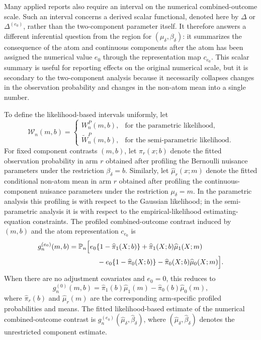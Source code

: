 \documentclass[11pt]{article}
\begin{document}
Many applied reports also require an interval on the numerical combined-outcome scale. Such an interval concerns a derived scalar functional, denoted here by $\Delta$ or $\Delta^{(e_0)}$, rather than the two-component parameter itself. It therefore answers a different inferential question from the region for $(\mu_\delta,\beta_\delta)$: it summarizes the consequence of the atom and continuous components after the atom has been assigned the numerical value $e_0$ through the representation map $c_{e_0}$. This scalar summary is useful for reporting effects on the original numerical scale, but it is secondary to the two-component analysis because it necessarily collapses changes in the observation probability and changes in the non-atom mean into a single number.

To define the likelihood-based intervals uniformly, let
\begin{equation}
  \mathcal{W}_n(m,b)
  =
  \begin{cases}
    W_n^P(m,b), & \text{for the parametric likelihood},\\[0.4em]
    \widetilde{W}_n^P(m,b), & \text{for the semi-parametric likelihood}.
  \end{cases}
  \label{eq:generic-lr-surface}
\end{equation}
For fixed component contrasts $(m,b)$, let $\widehat{\pi}_r(x;b)$ denote the fitted observation probability in arm $r$ obtained after profiling the Bernoulli nuisance parameters under the restriction $\beta_\delta=b$. Similarly, let $\widehat{\mu}_r(x;m)$ denote the fitted conditional non-atom mean in arm $r$ obtained after profiling the continuous-component nuisance parameters under the restriction $\mu_\delta=m$. In the parametric analysis this profiling is with respect to the Gaussian likelihood; in the semi-parametric analysis it is with respect to the empirical-likelihood estimating-equation constraints. The profiled combined-outcome contrast induced by $(m,b)$ and the atom representation $c_{e_0}$ is
\begin{align}
  g_n^{(e_0)}(m,b)
  &=
  \mathbb{P}_n
  \Bigl[
    e_0\{1-\widehat{\pi}_1(X;b)\}
    + \widehat{\pi}_1(X;b)\widehat{\mu}_1(X;m)
    \nonumber\\
  &\qquad\qquad
    - e_0\{1-\widehat{\pi}_0(X;b)\}
    - \widehat{\pi}_0(X;b)\widehat{\mu}_0(X;m)
  \Bigr].
  \label{eq:profiled-delta-map}
\end{align}
When there are no adjustment covariates and $e_0=0$, this reduces to
\[
  g_n^{(0)}(m,b)
  =
  \widehat{\pi}_1(b)\widehat{\mu}_1(m)
  -
  \widehat{\pi}_0(b)\widehat{\mu}_0(m),
\]
where $\widehat{\pi}_r(b)$ and $\widehat{\mu}_r(m)$ are the corresponding arm-specific profiled probabilities and means. The fitted likelihood-based estimate of the numerical combined-outcome contrast is $g_n^{(e_0)}(\widehat{\mu}_\delta,\widehat{\beta}_\delta)$, where $(\widehat{\mu}_\delta,\widehat{\beta}_\delta)$ denotes the unrestricted component estimate.
\end{document}
